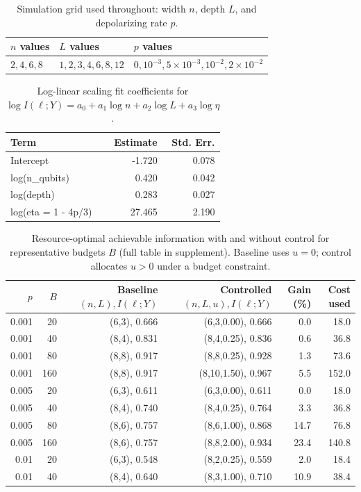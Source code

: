 \documentclass[journal]{IEEEtran}
\newcommand{\MI}{I(\ell;Y)}
\begin{document}
\begin{table}[t]
\caption{Simulation grid used throughout: width $n$, depth $L$, and depolarizing rate $p$.}
\label{tab:grid}
\centering
\footnotesize
\begin{tabular}{llp{}}
\toprule
$n$ values & $L$ values & $p$ values\\
\midrule
$2,4,6,8$ & $1,2,3,4,6,8,12$ & $0,10^{-3},5\times10^{-3},10^{-2},2\times10^{-2}$\\
\bottomrule
\end{tabular}
\end{table}
\begin{table}[t]
\caption{Log-linear scaling fit coefficients for $\log \MI = a_0 + a_1\log n + a_2\log L + a_3\log\eta$.}
\label{tab:coeff}
\centering
\begin{tabular}{lrr}
\toprule
Term & Estimate & Std. Err.\\
\midrule
Intercept & -1.720 & 0.078\\
log(n\_qubits) & 0.420 & 0.042\\
log(depth) & 0.283 & 0.027\\
log(eta = 1 - 4p/3) & 27.465 & 2.190\\
\bottomrule
\end{tabular}
\end{table}
\begin{table}[t]
\caption{Resource-optimal achievable information with and without control for representative budgets $B$ (full table in supplement). Baseline uses $u=0$; control allocates $u>0$ under a budget constraint.}
\label{tab:budget}
\centering
\scriptsize
\begin{tabular}{rrrrrr}
\toprule
$p$ & $B$ & Baseline $(n,L),\MI$ & Controlled $(n,L,u),\MI$ & Gain (\%) & Cost used\\
\midrule
0.001 & 20 & (6,3), 0.666 & (6,3,0.00), 0.666 & 0.0 & 18.0\\
0.001 & 40 & (8,4), 0.831 & (8,4,0.25), 0.836 & 0.6 & 36.8\\
0.001 & 80 & (8,8), 0.917 & (8,8,0.25), 0.928 & 1.3 & 73.6\\
0.001 & 160 & (8,8), 0.917 & (8,10,1.50), 0.967 & 5.5 & 152.0\\
0.005 & 20 & (6,3), 0.611 & (6,3,0.00), 0.611 & 0.0 & 18.0\\
0.005 & 40 & (8,4), 0.740 & (8,4,0.25), 0.764 & 3.3 & 36.8\\
0.005 & 80 & (8,6), 0.757 & (8,6,1.00), 0.868 & 14.7 & 76.8\\
0.005 & 160 & (8,6), 0.757 & (8,8,2.00), 0.934 & 23.4 & 140.8\\
0.01 & 20 & (6,3), 0.548 & (8,2,0.25), 0.559 & 2.0 & 18.4\\
0.01 & 40 & (8,4), 0.640 & (8,3,1.00), 0.710 & 10.9 & 38.4\\
\bottomrule
\end{tabular}
\end{table}
\end{document}
